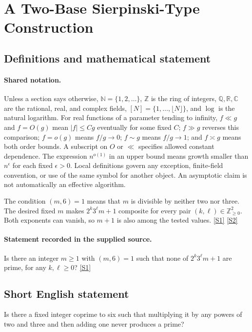 \documentclass[11pt,a4paper]{article}
\newcommand{\N}{\mathbb{N}}
\newcommand{\Z}{\mathbb{Z}}
\newcommand{\Q}{\mathbb{Q}}
\newcommand{\R}{\mathbb{R}}
\newcommand{\C}{\mathbb{C}}
\newcommand{\sref}[2]{\hyperlink{source:#1:#2}{[S#2]}}
\begin{document}
\section{A Two-Base Sierpinski-Type Construction}\label{statement}


\subsection{Definitions and mathematical statement}

\paragraph{Shared notation.}Unless a section says otherwise, $\N=\{1,2,\ldots\}$,
$\Z$ is the ring of integers, $\Q,\R,\C$ are the rational, real, and complex
fields, $[N]=\{1,\ldots,\lfloor N\rfloor\}$, and $\log$ is the natural
logarithm. For real functions of a parameter tending to infinity,
$f\ll g$ and $f=O(g)$ mean $|f|\leq Cg$ eventually for some fixed $C$;
$f\gg g$ reverses this comparison; $f=o(g)$ means $f/g\to0$;
$f\sim g$ means $f/g\to1$; and $f\asymp g$ means both order bounds.
A subscript on $O$ or $\ll$ specifies allowed constant dependence.
The expression $n^{o(1)}$ in an upper bound means growth smaller than
$n^\epsilon$ for each fixed $\epsilon>0$. Local definitions govern any
exception, finite-field convention, or use of the same symbol for another
object. An asymptotic claim is not automatically an effective algorithm.



The condition $(m,6)=1$ means that $m$ is divisible by neither two nor three. The desired fixed $m$ makes $2^k3^\ell m+1$ composite for every pair $(k,\ell)\in\Z_{\geq0}^2$. Both exponents can vanish, so $m+1$ is also among the tested values. \sref{statement}{1} \sref{statement}{2}

\paragraph{Statement recorded in the supplied source.}
Is there an integer $m\geq 1$ with $(m,6)=1$ such that none of $2^k3^\ell m+1$ are prime, for any $k,\ell\geq 0$? \sref{statement}{1}

\subsection{Short English statement}

Is there a fixed integer coprime to six such that multiplying it by any powers of two and three and then adding one never produces a prime?
\end{document}
